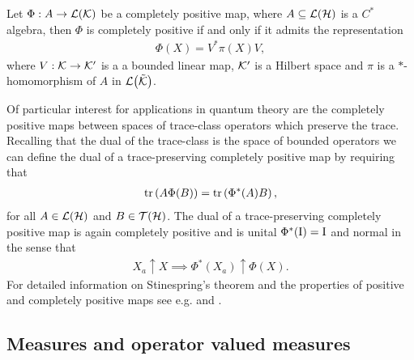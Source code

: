 \begin{thm}[Stinespring]\label{thm:stinespring}
  Let $\Phi:A\to\bops[\kcal]$ be a completely positive map, where $A\subseteq\bops[\hcal]$ is a $C^*$ algebra, then $\Phi$ is completely positive if and only if it admits the representation
  \begin{align}
    \Phi(X) = V^* \pi(X) V,
  \end{align}
  where $V:\mathcal{K}\to\mathcal{K}^\prime$ is a a bounded linear map, $\mathcal{K}^\prime$ is a Hilbert space and $\pi$ is a $*$-homomorphism of $A$ in $\bops[\tilde{\kcal}]$.
\end{thm}

Of particular interest for applications in quantum theory are the completely positive maps between spaces of trace-class operators which preserve the trace. Recalling that the dual of the trace-class is the space of bounded operators we can define the dual of a trace-preserving completely positive map by requiring that
\begin{align}
  \operatorname{tr}\left( A \Phi(B) \right) = \operatorname{tr}\left( \Phi^*(A) B \right),
\end{align}
for all $A\in\bops[\hcal]$ and $B\in\trops[\hcal]$. The dual of a trace-preserving completely positive map is again completely positive and is unital $\Phi^*(\operatorname{I}) = \operatorname{I}$ and normal in the sense that
\begin{align}
  X_a \uparrow X \implies \Phi^*(X_a) \uparrow \Phi(X).
\end{align}
For detailed information on Stinespring's theorem and the properties of positive and completely positive maps see e.g. \cite{stormer1963} and \cite{stormer1974}.

\subsection{Measures and operator valued measures}

